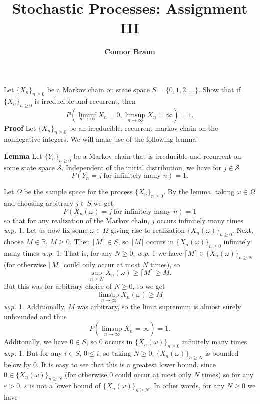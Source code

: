 \documentclass[11pt, letterpaper]{article}
\title{\bf Stochastic Processes: Assignment III}
\author{\bf Connor Braun}
\date{}
\newcommand{\mbb}[1]{\mathbb{#1}}
\newcommand{\mc}[1]{\mathcal{#1}}
\begin{document}
 
    \maketitle
     Let $\{X_n\}_{n\geq 0}$ be a Markov chain on state space $S=\{0,1,2,\dots\}$. Show that if $\{X_n\}_{n\geq 0}$ is irreducible and recurrent, then
    \[P\left(\liminf_{n\rightarrow\infty}X_n=0,\limsup_{n\rightarrow\infty} X_n=\infty\right)=1.\]
    {\bf Proof} Let $\{X_n\}_{n\geq 0}$ be an irreducible, recurrent markov chain on the nonnegative integers. We will make use of the following lemma:
    \begin{center}
        \begin{minipage}[c]{0.85\linewidth}
            {\bf Lemma} Let $\{Y_n\}_{n\geq 0}$ be a Markov chain that is irreducible and recurrent on some state space $\mc{S}$. Independent of the initial distribution, we have for $j\in\mc{S}$
            \[P(Y_n=j\;\text{for infinitely many $n$})=1.\]  
        \end{minipage}
    \end{center}\vspace{10pt}
    Let $\Omega$ be the sample space for the process $\{X_n\}_{n\geq 0}$. By the lemma, taking $\omega\in\Omega$ and choosing arbitrary $j\in S$ we get
    \[P(X_n(\omega)=j\;\text{for infinitely many $n$})=1\]
    so that for any realization of the Markov chain, $j$ occurs infinitely many times {\it w.p.} 1.
    Let us now fix some $\omega\in\Omega$ giving rise to realization $\{X_n(\omega)\}_{n\geq 0}$. Next, choose $M\in\mbb{R}$, $M\geq 0$. Then $\lceil M\rceil\in S$, so $\lceil M\rceil$ occurs in $\{X_n(\omega)\}_{n\geq 0}$ infinitely many times {\it w.p.} 1.
    That is, for any $N\geq 0$, {\it w.p.} 1 we have $\lceil M\rceil\in\{X_n(\omega)\}_{n\geq N}$ (for otherwise $\lceil M\rceil$ could only occur at most $N$ times), so
    \[\sup_{n\geq N}X_n(\omega)\geq\lceil M\rceil\geq M.\]
    But this was for arbitrary choice of $N\geq 0$, so we get
    \[\limsup_{n\rightarrow\infty}X_n(\omega)\geq M\]
    {\it w.p.} 1. Additionally, $M$ was arbitrary, so the limit supremum is almost surely unbounded and thus
    \[P(\limsup_{n\rightarrow\infty}X_n=\infty)=1.\tag{4}\]
    Additonally, we have $0\in S$, so $0$ occurs in $\{X_n(\omega)\}_{n\geq 0}$ infinitely many times {\it w.p.} 1. But for any $i\in S$, $0\leq i$, so taking $N\geq 0$, $\{X_n(\omega)\}_{n\geq N}$ is bounded below by $0$. It is easy to see that this is a greatest lower bound,
    since $0\in\{X_n(\omega)\}_{n\geq N}$ (for otherwise $0$ could occur at most only $N$ times) so for any $\varepsilon>0$, $\varepsilon$ is not a lower bound of $\{X_n(\omega)\}_{n\geq N}$. In other words, for any $N\geq 0$ we have
\end{document}
